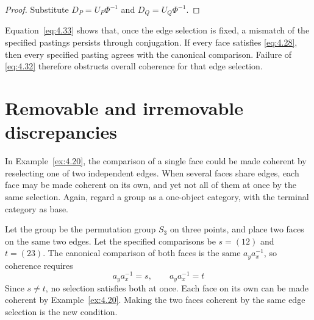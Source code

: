 \begin{proof}

Substitute $D_P=U_P\Phi^{-1}$ and $D_Q=U_Q\Phi^{-1}$.

\end{proof}

Equation~\eqref{eq:4.33} shows that, once the edge selection is fixed, a mismatch of the
specified pastings persists through conjugation.
If every face satisfies \eqref{eq:4.28}, then every specified pasting agrees with the
canonical comparison.
Failure of \eqref{eq:4.32} therefore obstructs overall coherence for that edge selection.

\section{Removable and irremovable discrepancies}\label{sec:4.8}

In Example~\ref{ex:4.20}, the comparison of a single face could be made coherent by
reselecting one of two independent edges.
When several faces share edges, each face may be made coherent on its own, and yet not all of them at
once by the same selection.
Again, regard a group as a one-object category, with the terminal category as base.

\begin{example}\label{ex:4.28}

Let the group be the permutation group $S_3$ on three points, and place two faces on the
same two edges.
Let the specified comparisons be $s=(12)$ and $t=(23)$.
The canonical comparison of both faces is the same $a_ya_x^{-1}$, so coherence requires
\begin{equation*}
a_ya_x^{-1}=s,\qquad a_ya_x^{-1}=t
\tag{4.34}\label{eq:4.34}
\end{equation*}
Since $s\ne t$, no selection satisfies both at once.
Each face on its own can be made coherent by Example~\ref{ex:4.20}.
Making the two faces coherent by the same edge selection is the new condition.

\end{example}

